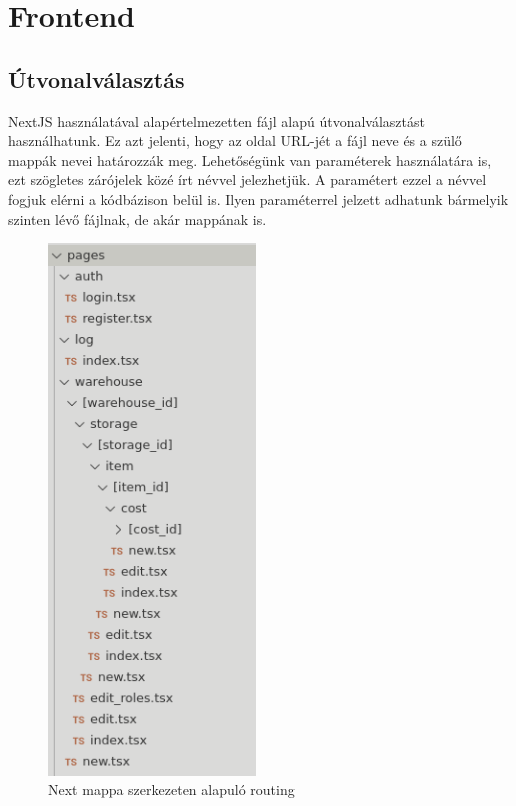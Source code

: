 \section{Frontend}


\subsection{Útvonalválasztás}
NextJS használatával alapértelmezetten fájl alapú útvonalválasztást használhatunk.
Ez azt jelenti, hogy az oldal URL-jét a fájl neve és a szülő mappák nevei határozzák meg.
Lehetőségünk van paraméterek használatára is, ezt szögletes zárójelek közé írt névvel jelezhetjük.
A paramétert ezzel a névvel fogjuk elérni a kódbázison belül is.
Ilyen paraméterrel jelzett adhatunk bármelyik szinten lévő fájlnak, de akár mappának is.

\begin{figure}[!ht]
  \centering
  \includegraphics[width=55mm, keepaspectratio]{figures/next_routing.png}
  \caption{Next mappa szerkezeten alapuló routing}
  \label{fig:NextRouting}
\end{figure}


